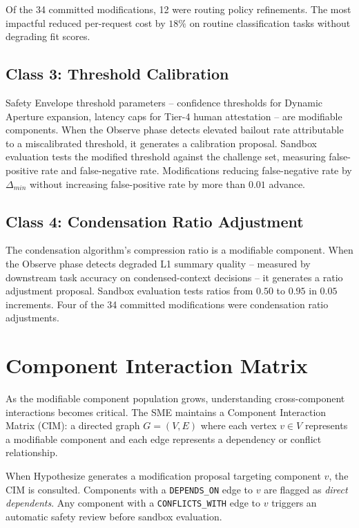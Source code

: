 \documentclass[12pt]{article}
\begin{document}
Of the 34 committed modifications, 12 were routing policy refinements. The most impactful reduced per-request cost by $18\%$ on routine classification tasks without degrading fit scores.

\subsection{Class 3: Threshold Calibration}
Safety Envelope threshold parameters -- confidence thresholds for Dynamic Aperture expansion, latency caps for Tier-4 human attestation -- are modifiable components. When the Observe phase detects elevated bailout rate attributable to a miscalibrated threshold, it generates a calibration proposal. Sandbox evaluation tests the modified threshold against the challenge set, measuring false-positive rate and false-negative rate. Modifications reducing false-negative rate by $\Delta_{min}$ without increasing false-positive rate by more than $0.01$ advance.

\subsection{Class 4: Condensation Ratio Adjustment}
The condensation algorithm's compression ratio is a modifiable component. When the Observe phase detects degraded L1 summary quality -- measured by downstream task accuracy on condensed-context decisions -- it generates a ratio adjustment proposal. Sandbox evaluation tests ratios from $0.50$ to $0.95$ in $0.05$ increments. Four of the 34 committed modifications were condensation ratio adjustments.

\section{Component Interaction Matrix}
\label{sec:interaction-matrix}

As the modifiable component population grows, understanding cross-component interactions becomes critical. The SME maintains a Component Interaction Matrix (CIM): a directed graph $G = (V, E)$ where each vertex $v \in V$ represents a modifiable component and each edge represents a dependency or conflict relationship.

When Hypothesize generates a modification proposal targeting component $v$, the CIM is consulted. Components with a \texttt{DEPENDS\_ON} edge to $v$ are flagged as \textit{direct dependents}. Any component with a \texttt{CONFLICTS\_WITH} edge to $v$ triggers an automatic safety review before sandbox evaluation.
\end{document}
